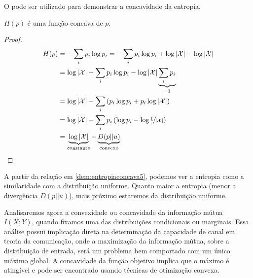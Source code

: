 O  pode ser utilizado para demonstrar a concavidade da entropia.
\begin{theorem}\label{thm:entropiaconcava}
$H(p)$ é uma função concava de $p$.
\end{theorem}
\begin{proof}
\begin{subequations}\label{dem:entropiaconcava}
\begin{align}
    H(p) &= - \sum_i p_i \log p_i = - \sum_i p_i \log p_i  + \log \vert \mathcal{X} \vert - \log \vert \mathcal{X} \vert \label{dem:entropiaconcava1}\\
        &= \log \vert \mathcal{X} \vert - \sum_i p_i \log p_i - \log \vert \mathcal{X} \vert \underbrace{\sum_i p_i}_{=1} \label{dem:entropiaconcava2}\\
        &= \log \vert \mathcal{X} \vert - \sum_i \left( p_i \log p_i + p_i \log \vert \mathcal{X} \vert \right) \label{dem:entropiaconcava3}\\
        &= \log \vert \mathcal{X} \vert - \sum_i p_i \left( \log p_i -  \log \sfrac{1}{\vert \mathcal{X} \vert } \right) \label{dem:entropiaconcava4}\\
        &= \underbrace{\log \vert \mathcal{X} \vert}_{\text{constante}} - \underbrace{D(p||u)}_{\text{convexo}} \label{dem:entropiaconcava5}
\end{align}
\end{subequations}
\end{proof}
A partir da relação em \ref{dem:entropiaconcava5}, podemos ver a entropia como a similaridade com a distribuição uniforme.
Quanto maior a entropia (menor a divergência $D(p||u)$), mais próximo estaremos da distribuição uniforme.


Analisaremos agora a convexidade ou concavidade da informação mútua $I(X;Y)$, quando fixamos uma das distribuições condicionais ou marginais.
Essa análise possui implicação direta na determinação da capacidade de canal em teoria da comunicação, onde a maximização da informação mútua,
sobre a distribuição de entrada, será um problema bem comportado com um único máximo global. A concavidade da função objetivo
implica que o máximo é atingível e pode ser encontrado usando técnicas de otimização convexa.

